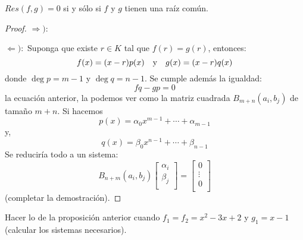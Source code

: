 \documentclass[12pt]{report}
\theoremstyle{largebreak}
\begin{document}
    \begin{propo}
        $Res(f,g)=0$ si y sólo si $f$ y $g$ tienen una raíz común.
    \end{propo}

    \begin{proof}
        $\Rightarrow):$

        $\Leftarrow):$ Suponga que existe $r\in K$ tal que $f(r)=g(r)$, entonces:
        \begin{equation*}
            f(x)=(x-r)p(x)\quad\textup{y}\quad g(x)=(x-r)q(x)
        \end{equation*}
        donde $\deg p=m-1$ y $\deg q=n-1$. Se cumple además la igualdad:
        \begin{equation*}
            fq-gp=0
        \end{equation*}
        la ecuación anterior, la podemos ver como la matriz cuadrada $B_{m+n}(a_i,b_j)$ de tamaño $m+n$. Si hacemos
        \begin{equation*}
            p(x)=\alpha_0x^{ m-1}+\cdots+\alpha_{ m-1}
        \end{equation*}
        y,
        \begin{equation*}
            q(x)=\beta_0x^{ n-1}+\cdots+\beta_{ n-1}
        \end{equation*}
        Se reduciría todo a un sistema:
        \begin{equation*}
            B_{ n+m}(a_i,b_j)\left[ 
                \begin{array}{c}
                    \alpha_i \\
                    \beta_j \\
                \end{array}
            \right]=\left[ 
                \begin{array}{c}
                    0 \\
                    \vdots \\
                    0 \\
                \end{array}
            \right]
        \end{equation*}
        (completar la demostración).
    \end{proof}

    \begin{excer}
        Hacer lo de la proposición anterior cuando $f_1=f_2=x^2-3x+2$ y $g_1=x-1$ (calcular los sistemas necesarios).
    \end{excer}
\end{document}
